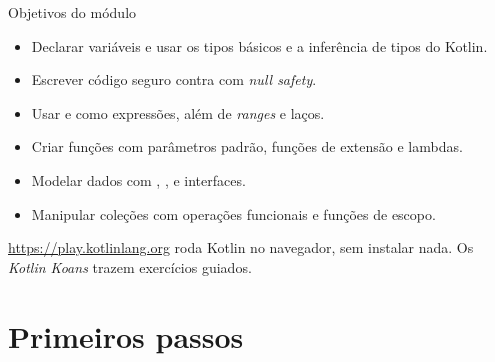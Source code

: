 \documentclass[aspectratio=169,10pt]{beamer}
\begin{document}
\capa

\begin{frame}{Objetivos do módulo}
  \begin{conceito}
    \begin{itemize}
      \item Declarar variáveis e usar os tipos básicos e a inferência de tipos do Kotlin.
      \item Escrever código seguro contra  com \emph{null safety}.
      \item Usar  e  como expressões, além de \emph{ranges} e laços.
      \item Criar funções com parâmetros padrão, funções de extensão e lambdas.
      \item Modelar dados com , ,  e interfaces.
      \item Manipular coleções com operações funcionais e funções de escopo.
    \end{itemize}
  \end{conceito}
  \begin{dica}
    \url{https://play.kotlinlang.org} roda Kotlin no navegador, sem instalar nada. Os \emph{Kotlin Koans} trazem exercícios guiados.
  \end{dica}
\end{frame}

\sumario

\section{Primeiros passos}
\end{document}
